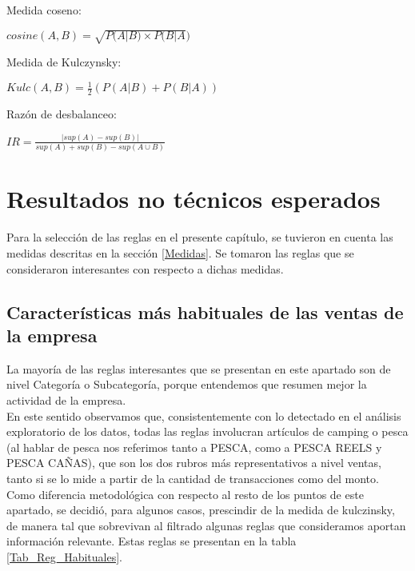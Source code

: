 \documentclass[]{article}
\begin{document}
	Medida coseno:
	
	\begin{center}
		$cosine(A,B) = \sqrt{P(A|B) \times P(B|A})$
	\end{center}
	
	Medida de Kulczynsky:
	
	\begin{center}
		$Kulc(A,B)= \frac{1}{2}\left(P(A|B) + P(B|A)\right)$	
	\end{center}
	
	Razón de desbalanceo:
	
	\begin{center}
		$IR = \frac{|sup(A)- sup(B)|}{sup(A)+ sup(B)-sup(A \cup B)}$	
	\end{center}
	
	\section{Resultados no técnicos esperados}
	
	Para la selección de las reglas en el presente capítulo, se tuvieron en cuenta las medidas descritas en la sección \ref*{Medidas}. Se tomaron las reglas que se consideraron interesantes con respecto a dichas medidas.
	
	
	\subsection{Características más habituales de las ventas de la empresa}
	
	La mayoría de las reglas interesantes que se presentan en este apartado son de nivel Categoría o Subcategoría, porque entendemos que resumen mejor la actividad de la empresa.\\
	
	En este sentido observamos que, consistentemente con lo detectado en el análisis exploratorio de los datos, todas las reglas involucran artículos de camping o pesca (al hablar de pesca nos referimos tanto a PESCA, como a PESCA REELS y PESCA CAÑAS), que son los dos rubros más representativos a nivel ventas, tanto si se lo mide a partir de la cantidad de transacciones como del monto.\\ 
	
	Como diferencia metodológica con respecto al resto de los puntos de este apartado, se decidió, para algunos casos, prescindir de la medida de kulczinsky, de manera tal que sobrevivan al filtrado algunas reglas que consideramos aportan información relevante. Estas reglas se presentan en la tabla \ref{Tab_Reg_Habituales}.
	
\end{document}
